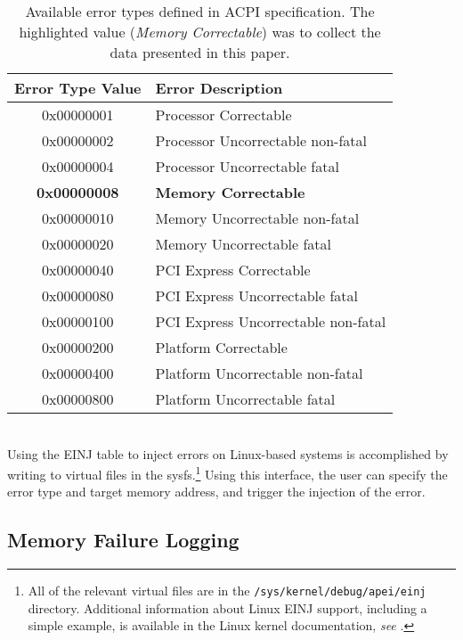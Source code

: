\begin{table}
\centering
\begin{tabular}{ c l }
\toprule
Error Type Value & Error Description \\
\midrule
 0x00000001 & Processor Correctable\\
 0x00000002 & Processor Uncorrectable non-fatal \\
 0x00000004 & Processor Uncorrectable fatal \\
        {\bf{0x00000008}} & {\bf{Memory Correctable}} \\
 0x00000010 & Memory Uncorrectable non-fatal \\
 0x00000020 & Memory Uncorrectable fatal \\
 0x00000040 & PCI Express Correctable \\
 0x00000080 & PCI Express Uncorrectable fatal \\
 0x00000100 & PCI Express Uncorrectable non-fatal \\
 0x00000200 & Platform Correctable \\
 0x00000400 & Platform Uncorrectable non-fatal \\
 0x00000800 & Platform Uncorrectable fatal \\
\bottomrule
\end{tabular}
\vspace{.6em}
\caption{
        Available error types defined in ACPI specification.  The highlighted value
        (\emph{Memory Correctable}) was to collect the data presented in this paper.
}
\label{tab:einj}
\end{table}

\\
Using the EINJ table to inject errors on Linux-based systems is accomplished by writing to virtual 
files in the sysfs.\footnote{All of the relevant virtual files are in the \texttt{/sys/kernel/debug/apei/einj}
directory.  Additional information about Linux EINJ support, including a simple example, is available
in the Linux kernel documentation, \emph{see} \cite{einj_web}.} Using this interface, the user can 
specify the error type and target memory address, and trigger the injection of the error.

\subsection{Memory Failure Logging}

